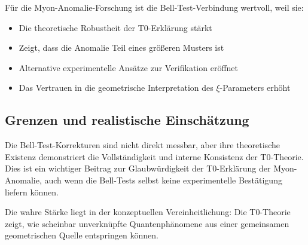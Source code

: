 \documentclass[12pt,a4paper]{article}
\begin{document}
		F\"ur die Myon-Anomalie-Forschung ist die Bell-Test-Verbindung wertvoll, weil sie:
		\begin{itemize}
			\item Die theoretische Robustheit der T0-Erkl\"arung st\"arkt
			\item Zeigt, dass die Anomalie Teil eines gr\"o\ss{}eren Musters ist
			\item Alternative experimentelle Ans\"atze zur Verifikation er\"offnet
			\item Das Vertrauen in die geometrische Interpretation des $\xi$-Parameters erh\"oht
		\end{itemize}
		
		\subsection{Grenzen und realistische Einsch\"atzung}
		
		Die Bell-Test-Korrekturen sind nicht direkt messbar, aber ihre theoretische Existenz demonstriert die Vollst\"andigkeit und interne Konsistenz der T0-Theorie. Dies ist ein wichtiger Beitrag zur Glaubw\"urdigkeit der T0-Erkl\"arung der Myon-Anomalie, auch wenn die Bell-Tests selbst keine experimentelle Best\"atigung liefern k\"onnen.
		
		Die wahre St\"arke liegt in der konzeptuellen Vereinheitlichung: Die T0-Theorie zeigt, wie scheinbar unverkn\"upfte Quantenph\"anomene aus einer gemeinsamen geometrischen Quelle entspringen k\"onnen.
	
	
\end{document}
